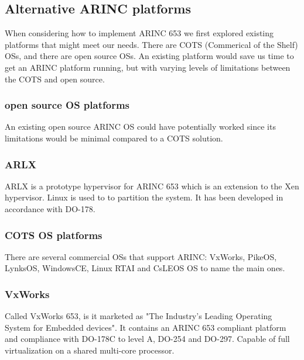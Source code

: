 \subsection{Alternative ARINC platforms}

When considering how to implement ARINC 653 we first explored existing platforms that might meet our needs. There are COTS (Commerical of the Shelf) OSs, and there are open source OSs. An existing platform would save us time to get an ARINC platform running, but with varying levels of limitations between the COTS and open source. 

\subsubsection{open source OS platforms}

An existing open source ARINC OS could have potentially worked since its limitations would be minimal compared to a COTS solution. %

\subsubsection{ARLX}

ARLX is a prototype hypervisor for ARINC 653 which is an extension to the Xen hypervisor. Linux is used to to partition the system. It has been developed in accordance with DO-178.


\subsubsection{COTS OS platforms}

There are several commercial OSs that support ARINC: VxWorks, PikeOS, LynksOS, WindowsCE, Linux RTAI and CsLEOS OS to name the main ones.

\subsubsection{VxWorks}
Called VxWorks 653, is it marketed as "The Industry's Leading Operating System for Embedded devices". It contains an ARINC 653 compliant platform and compliance with DO-178C to level A, DO-254 and DO-297. Capable of full virtualization on a shared multi-core processor.



\section{}
